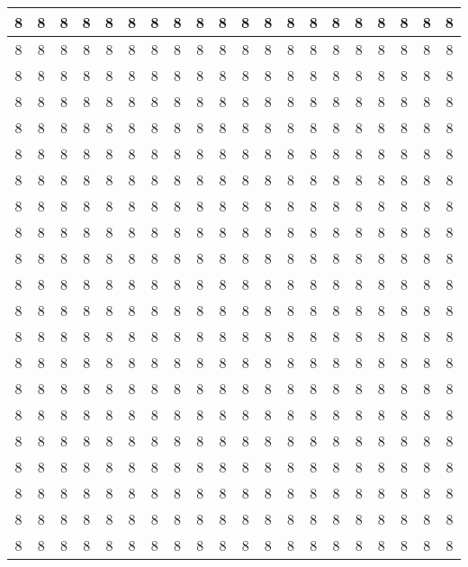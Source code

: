 \documentclass[letterpaper,11pt]{article}
\begin{document}
\begin{landscape}
\begin{center}
\begin{longtable}{|c|c|c|c|c|c|c|c|c|c|c|c|c|c|c|c|c|c|c|c|}
\hline
 8 & 8 & 8 & 8 & 8 & 8 & 8 & 8 & 8 & 8 & 8 & 8 & 8 & 8 & 8 & 8 & 8 & 8 & 8 & 8 \\
\hline
 8 & 8 & 8 & 8 & 8 & 8 & 8 & 8 & 8 & 8 & 8 & 8 & 8 & 8 & 8 & 8 & 8 & 8 & 8 & 8 \\
\hline
 8 & 8 & 8 & 8 & 8 & 8 & 8 & 8 & 8 & 8 & 8 & 8 & 8 & 8 & 8 & 8 & 8 & 8 & 8 & 8 \\
\hline
 8 & 8 & 8 & 8 & 8 & 8 & 8 & 8 & 8 & 8 & 8 & 8 & 8 & 8 & 8 & 8 & 8 & 8 & 8 & 8 \\
\hline
 8 & 8 & 8 & 8 & 8 & 8 & 8 & 8 & 8 & 8 & 8 & 8 & 8 & 8 & 8 & 8 & 8 & 8 & 8 & 8 \\
\hline
 8 & 8 & 8 & 8 & 8 & 8 & 8 & 8 & 8 & 8 & 8 & 8 & 8 & 8 & 8 & 8 & 8 & 8 & 8 & 8 \\
\hline
 8 & 8 & 8 & 8 & 8 & 8 & 8 & 8 & 8 & 8 & 8 & 8 & 8 & 8 & 8 & 8 & 8 & 8 & 8 & 8 \\
\hline
 8 & 8 & 8 & 8 & 8 & 8 & 8 & 8 & 8 & 8 & 8 & 8 & 8 & 8 & 8 & 8 & 8 & 8 & 8 & 8 \\
\hline
 8 & 8 & 8 & 8 & 8 & 8 & 8 & 8 & 8 & 8 & 8 & 8 & 8 & 8 & 8 & 8 & 8 & 8 & 8 & 8 \\
\hline
 8 & 8 & 8 & 8 & 8 & 8 & 8 & 8 & 8 & 8 & 8 & 8 & 8 & 8 & 8 & 8 & 8 & 8 & 8 & 8 \\
\hline
 8 & 8 & 8 & 8 & 8 & 8 & 8 & 8 & 8 & 8 & 8 & 8 & 8 & 8 & 8 & 8 & 8 & 8 & 8 & 8 \\
\hline
 8 & 8 & 8 & 8 & 8 & 8 & 8 & 8 & 8 & 8 & 8 & 8 & 8 & 8 & 8 & 8 & 8 & 8 & 8 & 8 \\
\hline
 8 & 8 & 8 & 8 & 8 & 8 & 8 & 8 & 8 & 8 & 8 & 8 & 8 & 8 & 8 & 8 & 8 & 8 & 8 & 8 \\
\hline
 8 & 8 & 8 & 8 & 8 & 8 & 8 & 8 & 8 & 8 & 8 & 8 & 8 & 8 & 8 & 8 & 8 & 8 & 8 & 8 \\
\hline
 8 & 8 & 8 & 8 & 8 & 8 & 8 & 8 & 8 & 8 & 8 & 8 & 8 & 8 & 8 & 8 & 8 & 8 & 8 & 8 \\
\hline
 8 & 8 & 8 & 8 & 8 & 8 & 8 & 8 & 8 & 8 & 8 & 8 & 8 & 8 & 8 & 8 & 8 & 8 & 8 & 8 \\
\hline
 8 & 8 & 8 & 8 & 8 & 8 & 8 & 8 & 8 & 8 & 8 & 8 & 8 & 8 & 8 & 8 & 8 & 8 & 8 & 8 \\
\hline
 8 & 8 & 8 & 8 & 8 & 8 & 8 & 8 & 8 & 8 & 8 & 8 & 8 & 8 & 8 & 8 & 8 & 8 & 8 & 8 \\
\hline
 8 & 8 & 8 & 8 & 8 & 8 & 8 & 8 & 8 & 8 & 8 & 8 & 8 & 8 & 8 & 8 & 8 & 8 & 8 & 8 \\
\hline
 8 & 8 & 8 & 8 & 8 & 8 & 8 & 8 & 8 & 8 & 8 & 8 & 8 & 8 & 8 & 8 & 8 & 8 & 8 & 8 \\
\hline
 8 & 8 & 8 & 8 & 8 & 8 & 8 & 8 & 8 & 8 & 8 & 8 & 8 & 8 & 8 & 8 & 8 & 8 & 8 & 8 \\

\end{longtable}
\end{center}
\end{landscape}
\end{document}
